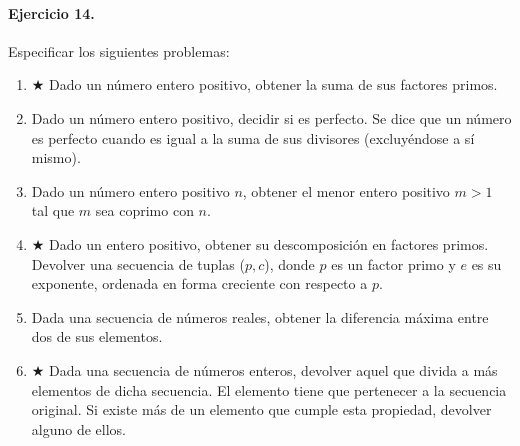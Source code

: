 \documentclass[a4paper]{article}
\begin{document}
\paragraph*{Ejercicio 14.} Especificar los siguientes problemas:
	\begin{enumerate}[label=\alph*)]
		\item $\bigstar$ Dado un número entero positivo, obtener la suma de sus factores primos.
		\item Dado un número entero positivo, decidir si es perfecto. Se dice que un número es
				perfecto cuando es igual a la suma de sus divisores (excluyéndose a sí mismo).
		\item Dado un número entero positivo $n$, obtener el menor entero positivo $m>1$ tal que
				$m$ sea coprimo con $n$.
		\item $\bigstar$ Dado un entero positivo, obtener su descomposición en factores primos.
			 	Devolver una secuencia de tuplas ($p,c$), donde $p$ es un factor primo y $e$ es su
			 	exponente, ordenada en forma creciente con respecto a $p$.
		\item Dada una secuencia de números reales, obtener la diferencia máxima entre dos de sus
				elementos.
		\item $\bigstar$ Dada una secuencia de números enteros, devolver aquel que divida a más
				elementos de dicha secuencia. El elemento tiene que pertenecer a la secuencia
				original. Si existe más de un elemento que cumple esta propiedad, devolver alguno 
				de ellos.
	\end{enumerate}
\end{document}
